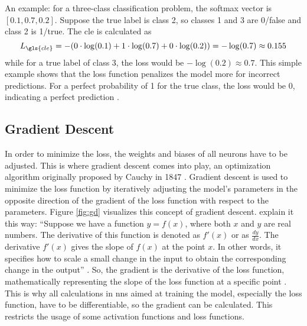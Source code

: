 An example: for a three-class classification problem, the softmax vector is \( [0.1, 0.7, 0.2] \). Suppose the true label is class 2, so classes 1 and 3 are 0/false and class 2 is 1/true. The \gls{cle} is calculated as
\begin{equation}
    L_{\gls{cle}} = -(0\cdot\log(0.1) + 1\cdot\log(0.7) + 0\cdot\log(0.2)) = -\log(0.7) \approx 0.155
\end{equation}
while for a true label of class 3, the loss would be \( -\log(0.2) \approx 0.7 \). This simple example shows that the loss function penalizes the model more for incorrect predictions. For a perfect probability of 1 for the true class, the loss would be 0, indicating a perfect prediction \autocite{Szeliski2022,Zhang.Lipton.ea2023}.

\subsection{Gradient Descent}

In order to minimize the loss, the weights and biases of all neurons have to be adjusted. This is where gradient descent comes into play, an optimization algorithm originally proposed by Cauchy in 1847 \autocite{Netrapalli2019}. Gradient descent is used to minimize the loss function by iteratively adjusting the model's parameters in the opposite direction of the gradient of the loss function with respect to the parameters. Figure \ref{fig:gd} visualizes this concept of gradient descent. \textcite{Goodfellow.Bengio.ea2016} explain it this way: \enquote{Suppose we have a function \( y = f(x) \), where both \( x \) and \( y \) are real numbers. The derivative of this function is denoted as \( f'(x) \)  or as \( \frac{dy}{dx} \). The derivative \( f'(x) \) gives the slope of \( f(x) \) at the point \( x \). In other words, it specifies how to scale a small change in the input to obtain the corresponding change in the output} \autocite[81]{Goodfellow.Bengio.ea2016}. So, the gradient is the derivative of the loss function, mathematically representing the slope of the loss function at a specific point \autocite{Nielsen2015,Szeliski2022}. This is why all calculations in \glspl{nn} aimed at training the model, especially the loss function, have to be differentiable, so the gradient can be calculated. This restricts the usage of some activation functions and loss functions.

